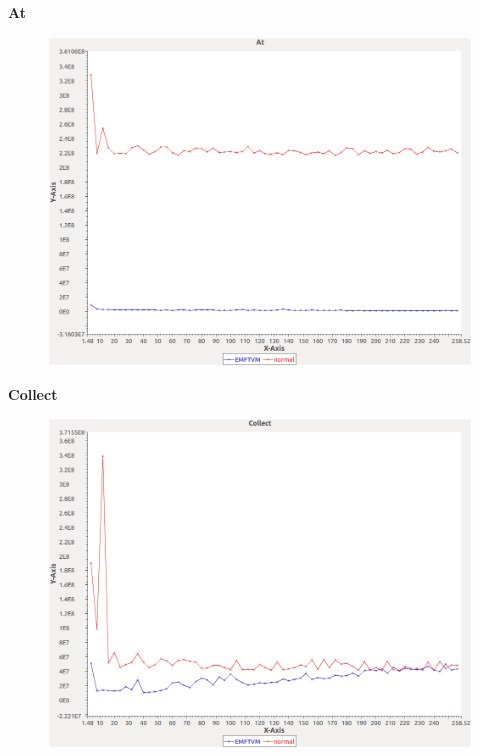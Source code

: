 \noindent\textbf{At}

\begin{figure}[h]
\centering
\includegraphics[width=\textwidth]{graphs/sequence/At}
\end{figure}
\pagebreak

\noindent\textbf{Collect}

\begin{figure}[h]
\centering
\includegraphics[width=\textwidth]{graphs/sequence/Collect}
\end{figure}
\pagebreak

